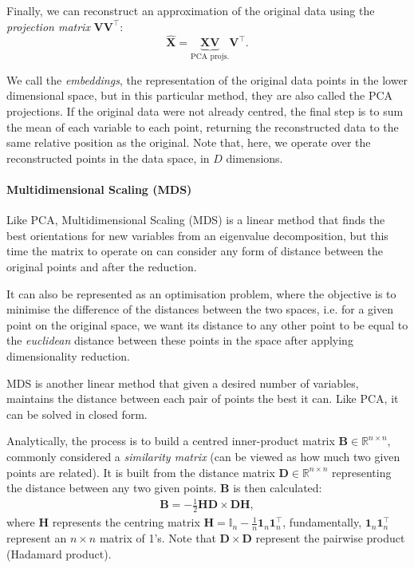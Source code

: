         Finally, we can reconstruct an approximation of the original data using the \textit{projection matrix} $\bm{VV}^\top$:
        \begin{equation}
            \bm{\hat{X}} = \underbrace{\bm{XV}}_{\text{PCA projs.}}\bm{V}^\top.
        \end{equation}
        
        We call the \textit{embeddings}, the representation of the original data points in the lower dimensional space, but in this particular method, they are also called the PCA projections.
        If the original data were not already centred, the final step is to sum the mean of each variable to each point, returning the reconstructed data to the same relative position as the original. Note that, here, we operate over the reconstructed points in the data space, in $D$ dimensions.
    
    \paragraph{Multidimensional Scaling (MDS)} %

        Like PCA, Multidimensional Scaling (MDS) \cite{mds, mds-nonmetric} is a linear method that finds the best orientations for new variables from an eigenvalue decomposition, but this time the matrix to operate on can consider any form of distance between the original points and after the reduction.
        
        It can also be represented as an optimisation problem, where the objective is to minimise the difference of the distances between the two spaces, i.e. for a given point on the original space, we want its distance to any other point to be equal to the \textit{euclidean} distance between these points in the space after applying dimensionality reduction.
        
        MDS is another linear method that given a desired number of variables, maintains the distance between each pair of points the best it can. Like PCA, it can be solved in closed form.
        
        Analytically, the process is to build a centred inner-product matrix $\bm{B}\in\mathbb{R}^{n\times n}$, commonly considered a \textit{similarity matrix} (can be viewed as how much two given points are related). It is built from the distance matrix $\bm{D}\in\mathbb{R}^{n\times n}$ representing the distance between any two given points. $\bm{B}$ is then calculated:
        \begin{align} %
            \bm{B} = -\frac{1}{2}\bm{HD} \times \bm{DH},
            \label{MDS similarity matrix}
        \end{align}
        where $\bm{H}$ represents the centring matrix $\bm{H} = \mathbb{I}_n - \frac{1}{n}\bm{1}_n\bm{1}_n^\top$, fundamentally, $\bm{1}_n\bm{1}_n^\top$ represent an $n\times n$ matrix of 1's. Note that $\bm{D} \times \bm{D}$ represent the pairwise product (Hadamard product).
        
